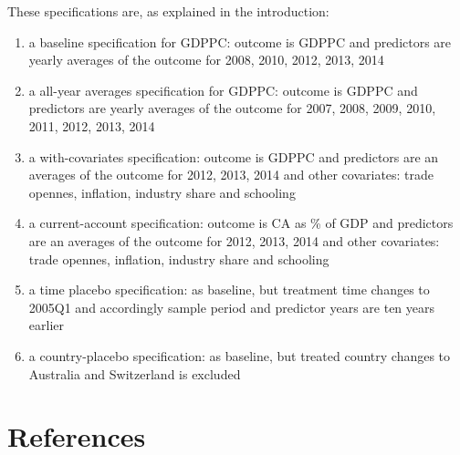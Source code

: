 \documentclass[a4paper,11pt,english]{sphinxmanual}
\begin{document}
These specifications are, as explained in the introduction:
\begin{enumerate}
\item {} 
a baseline specification for GDPPC: outcome is GDPPC and predictors are yearly averages of the outcome for 2008, 2010, 2012, 2013, 2014

\item {} 
a all-year averages specification for GDPPC: outcome is GDPPC and predictors are yearly averages of the outcome for 2007, 2008, 2009, 2010, 2011, 2012, 2013, 2014

\item {} 
a with-covariates specification: outcome is GDPPC and predictors are an averages of the outcome for 2012, 2013, 2014 and other covariates: trade opennes, inflation, industry share and schooling

\item {} 
a current-account specification: outcome is CA as \% of GDP and predictors are an averages of the outcome for 2012, 2013, 2014 and other covariates: trade opennes, inflation, industry share and schooling

\item {} 
a time placebo specification: as baseline, but treatment time changes to 2005Q1 and accordingly sample period and predictor years are ten years earlier

\item {} 
a country-placebo specification: as baseline, but treated country changes to Australia and Switzerland is excluded

\end{enumerate}


\chapter{References}
\label{references:references}\label{references:id1}\label{references::doc}
\end{document}
